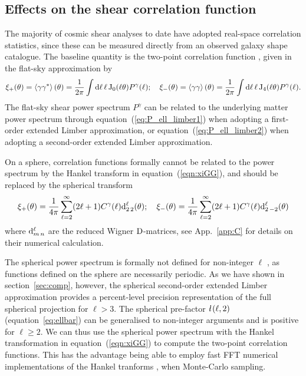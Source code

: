 \documentclass[fleqn,usenatbib]{mnras} %
\newcommand{\ellbar}{\hbox{\it \l}\,}
\begin{document}
\subsection{Effects on the shear correlation function}
\label{sec:comp_xi}

The majority of cosmic shear analyses to date have adopted real-space
correlation statistics, since these can be measured directly from an observed
galaxy shape catalogue. The baseline quantity is the two-point correlation
function \citep{1991ApJ...370....1M, 1992ApJ...388..272K, BS01}, given in the flat-sky approximation by
%
\begin{align}
  \xi_+(\theta) 
  = \left\langle \gamma \gamma^\ast \right\rangle(\theta) = \frac 1 {2\pi} \int {\rm d} \ell \, \ell \, {\rm J}_0(\ell
   \theta)
  P^\gamma(\ell);
  \quad
   \xi_-(\theta)
  = \left\langle \gamma \gamma \right\rangle(\theta) = \frac 1 {2\pi} \int
   {\rm d} \ell \, \ell \, {\rm J}_4(\ell \theta)
  P^\gamma(\ell).
   \label{eqn:xiGG}
\end{align}
%
The flat-sky shear power spectrum $P^\gamma$ can be related to the underlying
matter power spectrum through equation~(\ref{eq:P_ell_limber1}) when adopting a
first-order extended Limber approximation, or equation~(\ref{eq:P_ell_limber2})
when adopting a second-order extended Limber approximation.

On a sphere, correlation functions formally cannot be related to the power
spectrum by the Hankel transform in equation~(\ref{eqn:xiGG}), and should be
replaced by the spherical transform
\citep{1999IJMPD...8...61N,2004MNRAS.350..914C}
%
\begin{equation}
 \xi_+(\theta) 
  =  \frac 1{4\pi} \sum\limits_{\ell=2}^\infty (2 \ell + 1) C^\gamma(\ell) {\rm d}^\ell_{2\,2}(\theta); \quad 
 \xi_-(\theta) 
  =  \frac 1{4\pi} \sum\limits_{\ell=2}^\infty (2 \ell + 1) C^\gamma(\ell) {\rm d}^\ell_{2\,-2}(\theta)
  \label{eq:xi_wigner}
\end{equation}
%
where ${\rm d}^\ell_{m\,n}$ are the reduced Wigner ${\rm D}$-matrices, see App.~\ref{app:C} for details
on their numerical calculation.

The spherical power spectrum is formally not defined for non-integer $\ell$
\citep[see][for alternative spherical-sky formulae for the two-point
correlation function]{2005PhRvD..72b3516C}, as functions defined on the
sphere are necessarily periodic.
As we have shown in section~\ref{sec:comp}, however, the spherical second-order
extended Limber approximation provides a percent-level precision representation
of the full spherical projection for $\ell > 3$.
The spherical pre-factor $\ellbar(\ell, 2)$ (equation~\ref{eq:ellbar}) can be
generalised to non-integer arguments and is positive for $\ell \ge 2$. We can
thus use the spherical power spectrum with
the Hankel transformation in equation~(\ref{eqn:xiGG}) to compute the two-point correlation
functions. This has the advantage being able to employ fast FFT numerical implementations of
the Hankel tranforms \citep{2000MNRAS.312..257H}, when Monte-Carlo sampling.
\end{document}
